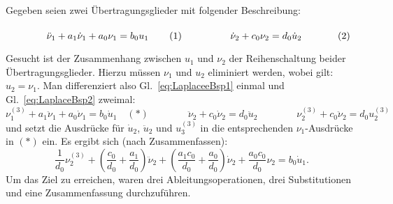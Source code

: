 \begin{RstBeispielBox}
  \begin{small}
  Gegeben seien zwei Übertragungsglieder mit folgender Beschreibung:

  \begin{subequations}
  \begin{minipage}[t]{0.5\linewidth}
  \begin{equation}
  \ddot \nu_1 + a_1 \dot \nu_1 + a_0 \nu_1 = b_0 u_1 \label{eq:LaplaceeBsp1}
  \end{equation}
  \end{minipage}
  \begin{minipage}[t]{0.5\linewidth}
  \begin{equation}
    \dot \nu_2 + c_0 \nu_2 = d_0 \dot u_2\label{eq:LaplaceBsp2}
  \end{equation}
  \end{minipage}
  \end{subequations}

  \vspace{2ex}

  Gesucht ist der Zusammenhang zwischen $u_1$ und $\nu_2$ der Reihenschaltung beider Übertragungsglieder. Hierzu müssen $\nu_1$ und $u_2$ eliminiert werden, wobei gilt: $u_2 = \nu_1$. Man differenziert also Gl.~\eqref{eq:LaplaceeBsp1} einmal und Gl.~\eqref{eq:LaplaceBsp2} zweimal:
  \begin{equation*}
    \nu_1^{(3)} + a_1 \ddot \nu_1 + a_0 \dot \nu_1 = b_0 \dot u_1 \quad (\ast) \qquad \qquad
  \ddot \nu_2 + c_0 \dot \nu_2 = d_0 \ddot u_2 \qquad \qquad \nu_2^{(3)} + c_0 \ddot \nu_2 = d_0 u_2^{(3)}
  \end{equation*}
  und setzt die Ausdrücke für $\dot u_2$, $\ddot u_2$ und $u_3^{(3)}$ in die entsprechenden $\nu_1$-Ausdrücke in $(\ast)$ ein. Es ergibt sich (nach Zusammenfassen):
  \begin{equation*}
  \frac{1}{d_0}\nu_2^{(3)} + \left(\frac{c_0}{d_0} + \frac{a_1}{d_0}\right)\ddot \nu_2 + \left(\frac{a_1 c_0}{d_0} + \frac{a_0}{d_0}\right) \dot \nu_2 + \frac{a_0 c_0}{d_0}\nu_2 = b_0 \dot u_1.
  \end{equation*}
  Um das Ziel zu erreichen, waren drei Ableitungsoperationen, drei Substitutionen und eine Zusammenfassung durchzuführen.
  \end{small}
\end{RstBeispielBox}

